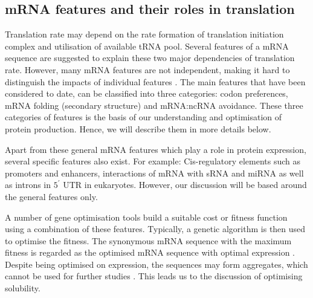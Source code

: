 \subsection{mRNA features and their roles in translation}
Translation rate may depend on the rate formation of translation initiation complex and utilisation of available tRNA pool. Several features of a mRNA sequence are suggested to explain these two major dependencies of translation rate. However, many mRNA features are not independent, making it hard to distinguish the impacts of individual features \cite{mauger2019mrna}. The main features that have been considered to date, can be classified into three categories: codon preferences, mRNA folding (secondary structure) and mRNA:ncRNA avoidance. These three categories of features is the basis of our understanding and optimisation of protein production. Hence, we will describe them in more details below.











Apart from these general mRNA features which play a role in protein expression, several specific features also exist. For example: Cis-regulatory elements such as promoters and enhancers, interactions of mRNA with sRNA and miRNA as well as introns in $5^{\prime}$ UTR in eukaryotes. However, our discussion will be based around the general features only. 


A number of gene optimisation tools build a suitable cost or fitness function using a combination of these features. Typically, a genetic algorithm is then used to optimise the fitness. The synonymous mRNA sequence with the maximum fitness is regarded as the optimised mRNA sequence with optimal expression \cite{Villalobos2006-nx, Salis2009-dh, Raab2010-eg, Chung2012-zh, Terai2016-vp}. Despite being optimised on expression, the sequences may form aggregates, which cannot be used for further studies \cite{gustafsson2004codon, rosano2009rare}. This leads us to the discussion of optimising solubility. 

